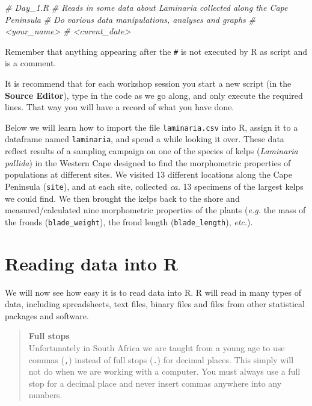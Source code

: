 \documentclass[
]{book}
\newenvironment{Shaded}{\begin{snugshade}}{\end{snugshade}}
\newcommand{\CommentTok}[1]{\textcolor[rgb]{0.56,0.35,0.01}{\textit{#1}}}
\begin{document}
\begin{Shaded}
\begin{Highlighting}[]
\CommentTok{\# Day\_1.R}
\CommentTok{\# Reads in some data about Laminaria collected along the Cape Peninsula}
\CommentTok{\# Do various data manipulations, analyses and graphs}
\CommentTok{\# <your\_name>}
\CommentTok{\# <curent\_date>}
\end{Highlighting}
\end{Shaded}

Remember that anything appearing after the \texttt{\#} is not executed by R as script and is a comment.

It is recommend that for each workshop session you start a new script (in the \textbf{Source Editor}), type in the code as we go along, and only execute the required lines. That way you will have a record of what you have done.

Below we will learn how to import the file \texttt{laminaria.csv} into R, assign it to a dataframe named \texttt{laminaria}, and spend a while looking it over. These data reflect results of a sampling campaign on one of the species of kelps (\emph{Laminaria pallida}) in the Western Cape designed to find the morphometric properties of populations at different sites. We visited 13 different locations along the Cape Peninsula (\texttt{site}), and at each site, collected \emph{ca.} 13 specimens of the largest kelps we could find. We then brought the kelps back to the shore and measured/calculated nine morphometric properties of the plants (\emph{e.g.} the mass of the fronds (\texttt{blade\_weight}), the frond length (\texttt{blade\_length}), \emph{etc.}).

\hypertarget{reading-data-into-r}{%
\section{Reading data into R}\label{reading-data-into-r}}

We will now see how easy it is to read data into R. R will read in many types of data, including spreadsheets, text files, binary files and files from other statistical packages and software.

\begin{quote}
\textbf{Full stops}\\
Unfortunately in South Africa we are taught from a young age to use commas (\texttt{,}) instead of full stops (\texttt{.}) for decimal places. This simply will not do when we are working with a computer. You must always use a full stop for a decimal place and never insert commas anywhere into any numbers.
\end{quote}
\end{document}
